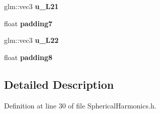 \begin{DoxyCompactItemize}
\item 
glm\+::vec3 {\bfseries u\+\_\+\+L21}\hypertarget{struct_spherical_harmonics_1_1_spherical_harmonics_format_a72ed217bbdb5f6fd2a5dfa60a239fe06}{}\label{struct_spherical_harmonics_1_1_spherical_harmonics_format_a72ed217bbdb5f6fd2a5dfa60a239fe06}

\item 
float {\bfseries padding7}\hypertarget{struct_spherical_harmonics_1_1_spherical_harmonics_format_a0e00f38ede5f648b5aa3004fce6f0492}{}\label{struct_spherical_harmonics_1_1_spherical_harmonics_format_a0e00f38ede5f648b5aa3004fce6f0492}

\item 
glm\+::vec3 {\bfseries u\+\_\+\+L22}\hypertarget{struct_spherical_harmonics_1_1_spherical_harmonics_format_aea627febf266a39fd0cfd5e82ac10e86}{}\label{struct_spherical_harmonics_1_1_spherical_harmonics_format_aea627febf266a39fd0cfd5e82ac10e86}

\item 
float {\bfseries padding8}\hypertarget{struct_spherical_harmonics_1_1_spherical_harmonics_format_a37eba59edf369ab56de7fad1b72be92b}{}\label{struct_spherical_harmonics_1_1_spherical_harmonics_format_a37eba59edf369ab56de7fad1b72be92b}

\end{DoxyCompactItemize}


\subsection{Detailed Description}


Definition at line 30 of file Spherical\+Harmonics.\+h.

